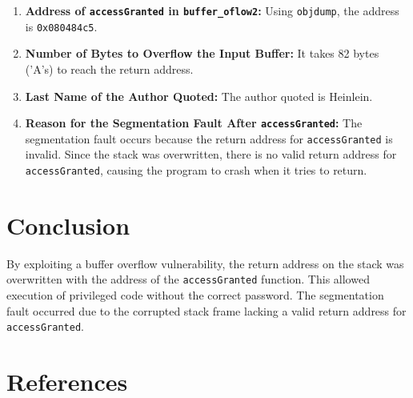 \documentclass[12pt]{article}
\begin{document}
\begin{enumerate}
    \item \textbf{Address of \texttt{accessGranted} in \texttt{buffer\_oflow2}:} Using \texttt{objdump}, the address is \texttt{0x080484c5}.
    \item \textbf{Number of Bytes to Overflow the Input Buffer:} It takes 82 bytes ('A's) to reach the return address.
    \item \textbf{Last Name of the Author Quoted:} The author quoted is Heinlein.
    \item \textbf{Reason for the Segmentation Fault After \texttt{accessGranted}:} The segmentation fault occurs because the return address for \texttt{accessGranted} is invalid. Since the stack was overwritten, there is no valid return address for \texttt{accessGranted}, causing the program to crash when it tries to return.
\end{enumerate}

\section{Conclusion}

By exploiting a buffer overflow vulnerability, the return address on the stack was overwritten with the address of the \texttt{accessGranted} function. This allowed execution of privileged code without the correct password. The segmentation fault occurred due to the corrupted stack frame lacking a valid return address for \texttt{accessGranted}.

\section{References}
\end{document}
